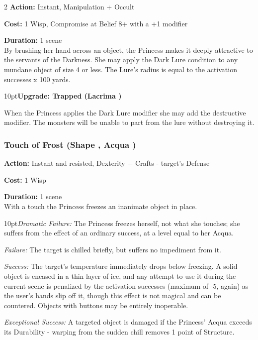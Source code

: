 \begin{multicols}{2}
\noindent \textbf{Action:} Instant, Manipulation + Occult

\noindent \textbf{Cost:} 1 Wisp, Compromise at Belief 8+ with a +1 modifier

\noindent \textbf{Duration:} 1 scene \\

\noindent By brushing her hand across an object, the Princess makes it deeply attractive to the servants of the Darkness. She may apply the Dark Lure condition to any mundane object of size 4 or less. The Lure's radius is equal to the activation successes x 100 yards.

\begin{myindentpar}{10pt}\textbf{Upgrade: Trapped (Lacrima \textbullet\textbullet)}

When the Princess applies the Dark Lure modifier she may add the destructive modifier. The monsters will be unable to part from the lure without destroying it.\end{myindentpar}


\subsubsection*{Touch of Frost (Shape \textbullet\textbullet, Acqua \textbullet)}
\noindent \textbf{Action:} Instant and resisted, Dexterity + Crafts - target's Defense

\noindent \textbf{Cost:} 1 Wisp

\noindent \textbf{Duration:} 1 scene\\

\noindent With a touch the Princess freezes an inanimate object in place.

\begin{myindentpar}{10pt}\emph{Dramatic Failure:} The Princess freezes herself, not what she touches; she suffers from the effect of an ordinary success, at a level equal to her Acqua.

\emph{Failure:} The target is chilled briefly, but suffers no impediment from it.

\emph{Success:} The target's temperature immediately drops below freezing. A solid object is encased in a thin layer of ice, and any attempt to use it during the current scene is penalized by the activation successes (maximum of -5, again) as the user's hands slip off it, though this effect is not magical and can be countered. Objects with buttons may be entirely inoperable.

\emph{Exceptional Success:} A targeted object is damaged if the Princess' Acqua exceeds its Durability - warping from the sudden chill removes 1 point of Structure.\end{myindentpar}


\end{multicols}
